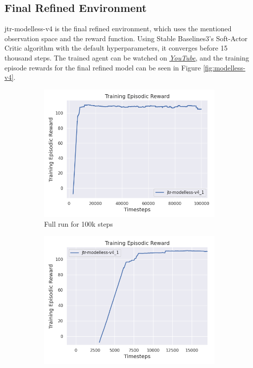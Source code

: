 \documentclass[12pt,twoside]{report}
\begin{document}
\subsection{Final Refined Environment}
jtr-modelless-v4 is the final refined environment, which uses the mentioned observation space and the reward function. Using Stable Baselines3's Soft-Actor Critic algorithm with the default hyperparameters, it converges before 15 thousand steps. The trained agent can be watched on \href{https://youtu.be/uccN--r2uc0} {\underline{\textit{YouTube}}}, and the training episode rewards for the final refined model can be seen in Figure \ref{fig:modelless-v4}.

\begin{figure}[h]
    \centering
    \begin{subfigure}[b]{0.48\textwidth}
        \centering
        \includegraphics[width=\textwidth]{figures/rl-refinements/modelless-v4 100k steps.png}
        \caption{Full run for 100k steps}
    \end{subfigure}
    \begin{subfigure}[b]{0.48\textwidth}
        \centering
        \includegraphics[width=\textwidth]{figures/rl-refinements/modelless-v4 zoomed in.png}

\end{subfigure}
\end{figure}
\end{document}
